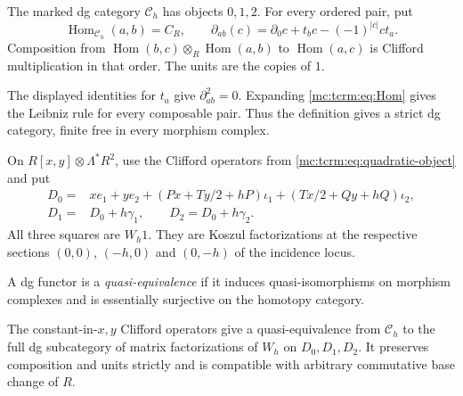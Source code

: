 \begin{definition}\label{mc:tcrm:def:category}
The marked dg category $\mathcal C_h$ has objects
$0,1,2$. For every ordered pair, put
\begin{equation}\label{mc:tcrm:eq:Hom}
 \operatorname{Hom}_{\mathcal C_h}(a,b)=C_R,
 \qquad
 \partial_{ab}(c)=\partial_0c+t_bc-(-1)^{|c|}ct_a.
\end{equation}
Composition from
$\operatorname{Hom}(b,c)\otimes_R\operatorname{Hom}(a,b)$
to $\operatorname{Hom}(a,c)$ is Clifford multiplication
in that order. The units are the copies of $1$.
\end{definition}

The displayed identities for $t_a$ give $\partial_{ab}^2=0$.
Expanding \eqref{mc:tcrm:eq:Hom} gives the Leibniz rule
for every composable pair. Thus the definition gives
a strict dg category, finite free in every morphism
complex.

On $R[x,y]\otimes\Lambda^*R^2$, use the Clifford
operators from \eqref{mc:tcrm:eq:quadratic-object} and put
\begin{align}
 D_0={}&xe_1+ye_2+(Px+Ty/2+hP)\iota_1
                       +(Tx/2+Qy+hQ)\iota_2,
                       \label{mc:tcrm:eq:objects}\\
 D_1={}&D_0+h\gamma_1,\qquad
 D_2=D_0+h\gamma_2.\nonumber
\end{align}
All three squares are $W_h1$. They are Koszul
factorizations at the respective sections
$(0,0)$, $(-h,0)$ and $(0,-h)$ of the incidence locus.

A dg functor is a \emph{quasi-equivalence} if it induces
quasi-isomorphisms on morphism complexes and is essentially
surjective on the homotopy category.

\begin{theorem}\label{mc:tcrm:thm:marked-model}
The constant-in-$x,y$ Clifford operators give a
quasi-equivalence from $\mathcal C_h$ to the full
dg subcategory of matrix factorizations of $W_h$
on $D_0,D_1,D_2$. It preserves composition and units
strictly and is compatible with arbitrary commutative
base change of $R$.
\end{theorem}

